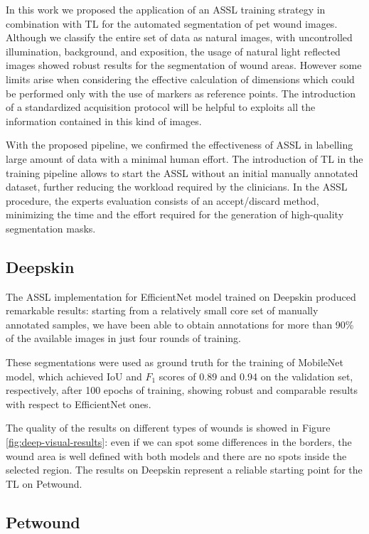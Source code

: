\documentclass[../main.tex]{subfiles}
\begin{document}
In this work we proposed the application of an ASSL training strategy in combination with TL for the automated segmentation of pet wound images. 
Although we classify the entire set of data as natural images, with uncontrolled illumination, background, and exposition, the usage of natural light reflected images showed robust results for the segmentation of wound areas.
However some limits arise when considering the effective calculation of dimensions which could be performed only with the use of markers as reference points.
The introduction of a standardized acquisition protocol will be helpful to exploits all the information contained in this kind of images.

With the proposed pipeline, we confirmed the effectiveness of ASSL in labelling large amount of data with a minimal human effort. 
The introduction of TL in the training pipeline allows to start the ASSL without an initial manually annotated dataset, further reducing the workload required by the clinicians. 
In the ASSL procedure, the experts evaluation consists of an accept/discard method, minimizing the time and the effort required for the generation of high-quality segmentation masks.

\subsection{Deepskin}

The ASSL implementation for EfficientNet model trained on Deepskin produced remarkable results: starting from a relatively small core set of manually annotated samples,  we have been able to obtain annotations for more than 90\% of the available images in just four rounds of training.

These segmentations were used as ground truth for the training of MobileNet model, which achieved IoU and $F_1$ scores of 0.89 and 0.94 on the validation set, respectively, after 100 epochs of training, showing robust and comparable results with respect to EfficientNet ones.

The quality of the results on different types of wounds is showed in Figure \ref{fig:deep-visual-results}: even if we can spot some differences in the borders, the wound area is well defined with both models and there are no spots inside the selected region.
The results on Deepskin represent a reliable starting point for the TL on Petwound.

\subsection{Petwound}
\end{document}
